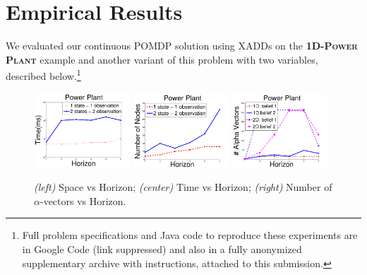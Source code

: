 \documentclass{article} %
\begin{document}

\section{Empirical Results}
We evaluated our continuous POMDP solution using XADDs on the
\textsc{\bf 1D-Power Plant} example and another variant of this
problem with two variables, described below.\footnote{ Full problem
specifications and Java code to reproduce these experiments are in
Google Code (link suppressed) and also in a fully
anonymized supplementary archive with instructions, attached to this 
submission.}

\begin{figure}[tbp!]
\vspace{2mm}
\centering
\includegraphics[width=0.32\textwidth]{pics/time2.pdf}
\includegraphics[width=0.32\textwidth]{pics/nodes2.pdf}
\includegraphics[width=0.32\textwidth]{pics/alpha-vectors2.pdf}
\vspace{-1mm}
\caption{\footnotesize 
{\it (left)} Space vs Horizon; 
{\it (center)} Time vs Horizon; 
{\it (right)} Number of $\alpha$-vectors vs Horizon.
}
\label{fig:timeSpace}
\end{figure}
\end{document}
